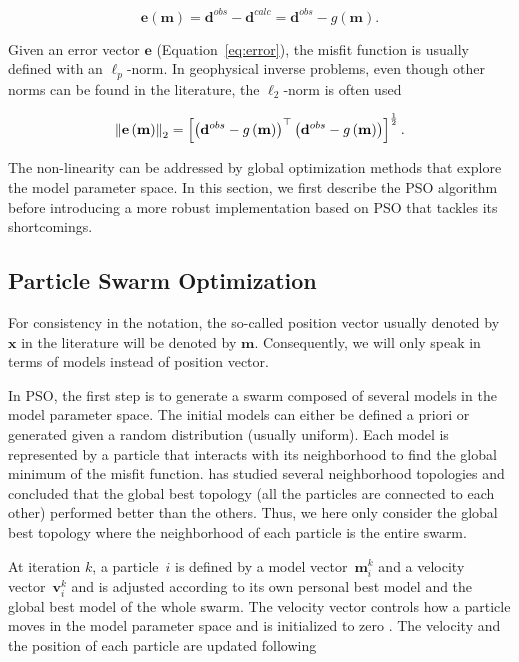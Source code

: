 \begin{equation}
	\mathbf{e} \left( \mathbf{m} \right) = \mathbf{d}^{obs} - \mathbf{d}^{calc} = \mathbf{d}^{obs} - g \left( \mathbf{m} \right).
	\label{eq:error}
\end{equation}

\noindent Given an error vector $\mathbf{e}$ (Equation~\ref{eq:error}), the misfit function is usually defined with an $\ell_{p}$-norm. In geophysical inverse problems, even though other norms can be found in the literature, the $\ell_{2}$-norm is often used

\begin{equation}
	\left\lVert\mathbf{e} \left( \mathbf{m} \right)\right\rVert_{2} = \left[ \left( \mathbf{d}^{obs} - g \left( \mathbf{m} \right) \right)^{\top} \left( \mathbf{d}^{obs} - g \left( \mathbf{m} \right) \right) \right]^{\frac{1}{2}}.
	\label{eq:norm2}
\end{equation}

\noindent The non-linearity can be addressed by global optimization methods that explore the model parameter space. In this section, we first describe the PSO algorithm before introducing a more robust implementation based on PSO that tackles its shortcomings.


\subsection{Particle Swarm Optimization}
\label{ssec:particle_swarm_optimization}

For consistency in the notation, the so-called position vector usually denoted by $\mathbf{x}$ in the literature will be denoted by $\mathbf{m}$. Consequently, we will only speak in terms of models instead of position vector.

In PSO, the first step is to generate a swarm composed of several models in the model parameter space. The initial models can either be defined a priori or generated given a random distribution (usually uniform). Each model is represented by a particle that interacts with its neighborhood to find the global minimum of the misfit function. \cite{Kennedy1999} has studied several neighborhood topologies and concluded that the global best topology (all the particles are connected to each other) performed better than the others. Thus, we here only consider the global best topology where the neighborhood of each particle is the entire swarm.

At iteration $k$, a particle~$i$ is defined by a model vector~$\mathbf{m}_{i}^{k}$ and a velocity vector~$\mathbf{v}_{i}^{k}$ and is adjusted according to its own personal best model and the global best model of the whole swarm. The velocity vector controls how a particle moves in the model parameter space and is initialized to zero \citep{Engelbrecht2012}. The velocity and the position of each particle are updated following

